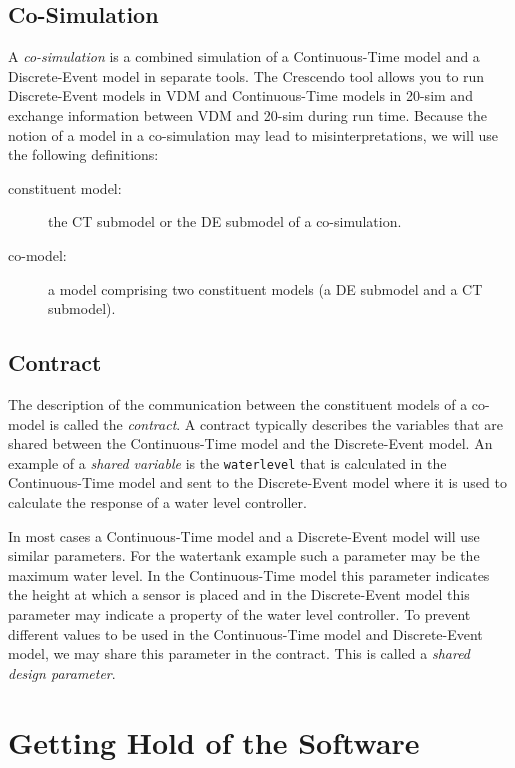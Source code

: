 \documentclass{crescendorepchap}
\begin{document}
\section{Co-Simulation}

A \emph{co-simulation} is a combined simulation of a Continuous-Time
model and a Discrete-Event model in separate tools. The Crescendo tool
allows you to run Discrete-Event models in VDM and Continuous-Time
models in 20-sim and exchange information between VDM and 20-sim during
run time. Because the notion of a model in a co-simulation may lead
to misinterpretations, we will use the following definitions:

\begin{description}
\item[constituent model:] the CT submodel or the
  DE submodel of a co-simulation.
\item[co-model:] a model comprising two constituent models (a
  DE submodel and a CT submodel).
\end{description}

\section{Contract}

The description of the communication between the constituent models of a
co-model is called the \emph{contract}. A contract typically describes
the variables that are shared between the Continuous-Time model and the
Discrete-Event model. An example of a \emph{shared variable} is the
\texttt{waterlevel} that is calculated in the Continuous-Time model and sent to
the Discrete-Event model where it is used to calculate the response of a
water level controller.

In most cases a Continuous-Time model and a Discrete-Event model will
use similar parameters. For the watertank example such a parameter may
be the maximum water level. In the Continuous-Time model this parameter
indicates the height at which a sensor is placed and in the Discrete-Event
model this parameter may indicate a property of the water level
controller. To prevent different values to be used in the
Continuous-Time model and Discrete-Event model, we may share this
parameter in the contract. This is called a \emph{shared design
parameter}.

\chapter{Getting Hold of the Software}\label{chap:getting}
\end{document}
